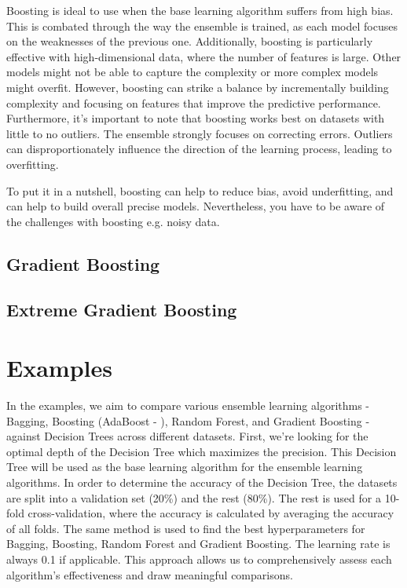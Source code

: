 Boosting is ideal to use when the base learning algorithm suffers from high bias.
This is combated through the way the ensemble is trained, as each model focuses on the
weaknesses of the previous one.
Additionally, boosting is particularly effective with high-dimensional data, where
the number of features is large. Other models might not be able to capture the 
complexity or more complex models might overfit.
However, boosting can strike a balance by incrementally building complexity and 
focusing on features that improve the predictive performance.
Furthermore, it's important to note that boosting works best on datasets with little 
to no outliers. The ensemble strongly focuses on correcting errors. Outliers can 
disproportionately influence the direction of the learning process, leading
to overfitting.


To put it in a nutshell, boosting can help to reduce bias, avoid underfitting,
and can help to build overall precise models. Nevertheless, you have to be aware
of the challenges with boosting e.g. noisy data.

\subsection{Gradient Boosting}

\subsection{Extreme Gradient Boosting}


\section{Examples}
In the examples, we aim to compare various ensemble learning algorithms - Bagging, 
Boosting (AdaBoost - \citet{freund1996experiments}), Random Forest, and Gradient 
Boosting - against Decision Trees across different datasets.
First, we're looking for the optimal depth of the Decision Tree which maximizes the 
precision. This Decision Tree will be used as the base learning algorithm for 
the ensemble learning algorithms.
In order to determine the accuracy of the Decision Tree, the datasets are split
into a validation set (20\%) and the rest (80\%). The rest is used for a 10-fold 
cross-validation, where the accuracy is calculated by averaging the accuracy of 
all folds.
The same method is used to find the best hyperparameters for Bagging, Boosting, 
Random Forest and Gradient Boosting. The learning rate is always 0.1 if 
applicable.
This approach allows us to comprehensively assess each algorithm's effectiveness
and draw meaningful comparisons.


